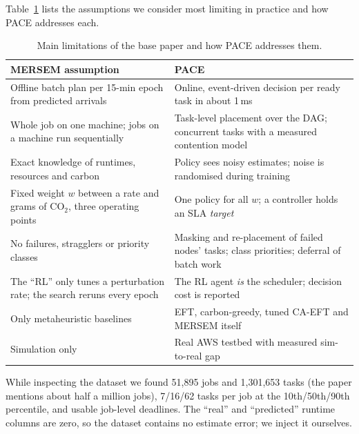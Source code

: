 \documentclass[11pt,a4paper]{article}
\begin{document}
Table~\ref{tab:critique} lists the assumptions we consider most limiting in practice and how PACE addresses each.

\begin{table}[H]
\centering\small
\caption{Main limitations of the base paper and how PACE addresses them.}
\label{tab:critique}
\begin{tabularx}{\textwidth}{>{\raggedright\arraybackslash}p{4.6cm}X}
\toprule
MERSEM assumption & PACE \\
\midrule
Offline batch plan per 15-min epoch from predicted arrivals & Online, event-driven decision per ready task in about 1\,ms \\
Whole job on one machine; jobs on a machine run sequentially & Task-level placement over the DAG; concurrent tasks with a measured contention model \\
Exact knowledge of runtimes, resources and carbon & Policy sees noisy estimates; noise is randomised during training \\
Fixed weight $w$ between a rate and grams of CO$_2$, three operating points & One policy for all $w$; a controller holds an SLA \emph{target} \\
No failures, stragglers or priority classes & Masking and re-placement of failed nodes' tasks; class priorities; deferral of batch work \\
The ``RL'' only tunes a perturbation rate; the search reruns every epoch & The RL agent \emph{is} the scheduler; decision cost is reported \\
Only metaheuristic baselines & EFT, carbon-greedy, tuned CA-EFT and MERSEM itself \\
Simulation only & Real AWS testbed with measured sim-to-real gap \\
\bottomrule
\end{tabularx}
\end{table}

While inspecting the dataset we found 51,895 jobs and 1,301,653 tasks (the paper mentions about half a million jobs), 7/16/62 tasks per job at the 10th/50th/90th percentile, and usable job-level deadlines. The ``real'' and ``predicted'' runtime columns are zero, so the dataset contains no estimate error; we inject it ourselves.
\end{document}
